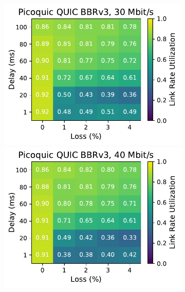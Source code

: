 \begin{figure}[ht]
\begin{subfigure}[b]{0.22\linewidth}
        \includegraphics[width=\linewidth,trim={0 0 2cm 0},clip]{splitting-paper/figures/heatmaps/heatmap_picoquic_bbr3_30mbps.pdf}
        \includegraphics[width=\linewidth,trim={0 0 2cm 0},clip]{splitting-paper/figures/heatmaps/heatmap_picoquic_bbr3_40mbps.pdf}

\end{subfigure}
\end{figure}
